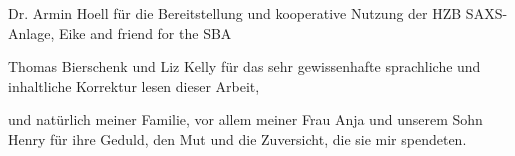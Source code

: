 \noindent Dr. Armin Hoell für die Bereitstellung und kooperative Nutzung der HZB SAXS-Anlage, Eike and friend for the SBA
\vspace{2ex}

\noindent Thomas Bierschenk und Liz Kelly für das sehr gewissenhafte sprachliche und inhaltliche Korrektur lesen dieser Arbeit,
\vspace{2ex}

\noindent und natürlich meiner Familie, vor allem meiner Frau Anja und unserem Sohn Henry für ihre Geduld, den Mut und die Zuversicht, die sie mir spendeten.







\cleardoublepage
